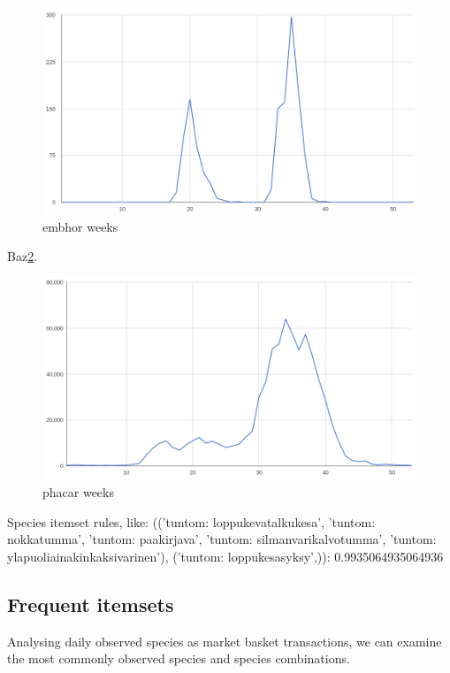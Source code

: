 \documentclass[english]{tktltiki2}
\begin{document}
\begin{figure}[htb]
\centering
\includegraphics[clip=true, width=\textwidth]{embhor_weeks}
\caption{embhor weeks}
\label{fig: embhor_weeks}
\end{figure}

Baz\ref{fig: phacar_weeks}.

\begin{figure}[htb]
\centering
\includegraphics[clip=true, width=\textwidth]{phacar_weeks}
\caption{phacar weeks}
\label{fig: phacar_weeks}
\end{figure}


Species itemset rules, like: {(('tuntom: loppukevatalkukesa', 'tuntom: nokkatumma', 'tuntom: paakirjava', 'tuntom: silmanvarikalvotumma', 'tuntom: ylapuoliainakinkaksivarinen'), ('tuntom: loppukesasyksy',)): 0.9935064935064936}

\subsection{Frequent itemsets}

Analysing daily observed species as market basket transactions, we can examine the most commonly observed species and species combinations.
\end{document}
